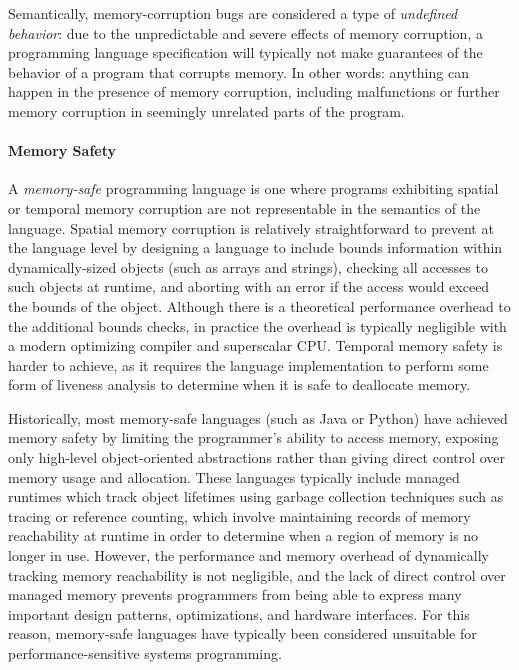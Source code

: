 Semantically, memory-corruption bugs are considered a type of \textit{undefined behavior}: due to
the unpredictable and severe effects of memory corruption, a programming language specification will
typically not make guarantees of the behavior of a program that corrupts memory. In other words:
anything can happen in the presence of memory corruption, including malfunctions or further memory
corruption in seemingly unrelated parts of the program.

\paragraph{Memory Safety} A \textit{memory-safe} programming language is one where programs
exhibiting spatial or temporal memory corruption are not representable in the semantics of the
language. Spatial memory corruption is relatively straightforward to prevent at the language level
by designing a language to include bounds information within dynamically-sized objects (such as
arrays and strings), checking all accesses to such objects at runtime, and aborting with an error if
the access would exceed the bounds of the object. Although there is a theoretical performance
overhead to the additional bounds checks, in practice the overhead is typically negligible with a
modern optimizing compiler and superscalar CPU. Temporal memory safety is harder to achieve, as it
requires the language implementation to perform some form of liveness analysis to determine when it
is safe to deallocate memory.

Historically, most memory-safe languages (such as Java or Python) have achieved memory safety by
limiting the programmer's ability to access memory, exposing only high-level object-oriented
abstractions rather than giving direct control over memory usage and allocation. These languages
typically include managed runtimes which track object lifetimes using garbage collection techniques
such as tracing or reference counting, which involve maintaining records of memory reachability at
runtime in order to determine when a region of memory is no longer in use. However, the performance
and memory overhead of dynamically tracking memory reachability is not negligible, and the lack of
direct control over managed memory prevents programmers from being able to express many important
design patterns, optimizations, and hardware interfaces. For this reason, memory-safe languages have
typically been considered unsuitable for performance-sensitive systems programming.

